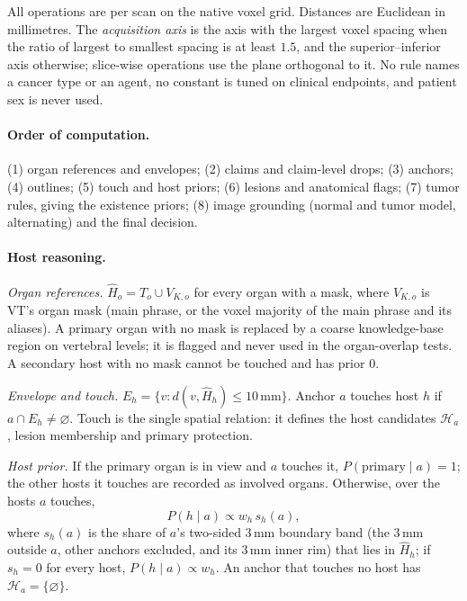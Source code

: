 \documentclass[fleqn,10pt]{olplainarticle}
\begin{document}
All operations are per scan on the native voxel grid. Distances are Euclidean in millimetres. The \emph{acquisition axis}
is the axis with the largest voxel spacing when the ratio of largest to smallest spacing is at least $1.5$, and the
superior--inferior axis otherwise; slice-wise operations use the plane orthogonal to it. No rule names a cancer type or an
agent, no constant is tuned on clinical endpoints, and patient sex is never used.

\paragraph{Order of computation.} (1) organ references and envelopes; (2) claims and claim-level drops; (3) anchors;
(4) outlines; (5) touch and host priors; (6) lesions and anatomical flags; (7) tumor rules, giving the existence priors;
(8) image grounding (normal and tumor model, alternating) and the final decision.

\paragraph{Host reasoning.}
\label{sec:host_details}
\emph{Organ references.} $\hat H_o=T_o\cup V_{K,o}$ for every organ with a mask, where $V_{K,o}$ is VT's organ mask (main
phrase, or the voxel majority of the main phrase and its aliases). A primary organ with no mask is replaced by a coarse
knowledge-base region on vertebral levels; it is flagged and never used in the organ-overlap tests. A secondary host with no
mask cannot be touched and has prior $0$.

\emph{Envelope and touch.} $E_h=\{v:d(v,\hat H_h)\le10\,\mathrm{mm}\}$. Anchor $a$ touches host $h$ if $a\cap E_h\neq\varnothing$.
Touch is the single spatial relation: it defines the host candidates $\mathcal{H}_a$, lesion membership and primary protection.

\emph{Host prior.} If the primary organ is in view and $a$ touches it, $P(\text{primary}\mid a)=1$; the other hosts it
touches are recorded as involved organs. Otherwise, over the hosts $a$ touches,
\begin{equation}
\label{eq:host_prior}
P(h\mid a)\propto w_h\,s_h(a),
\end{equation}
where $s_h(a)$ is the share of $a$'s two-sided $3$\,mm boundary band (the $3$\,mm outside $a$, other anchors excluded, and its
$3$\,mm inner rim) that lies in $\hat H_h$; if $s_h=0$ for every host, $P(h\mid a)\propto w_h$. An anchor that touches no host
has $\mathcal{H}_a=\{\varnothing\}$.
\end{document}
